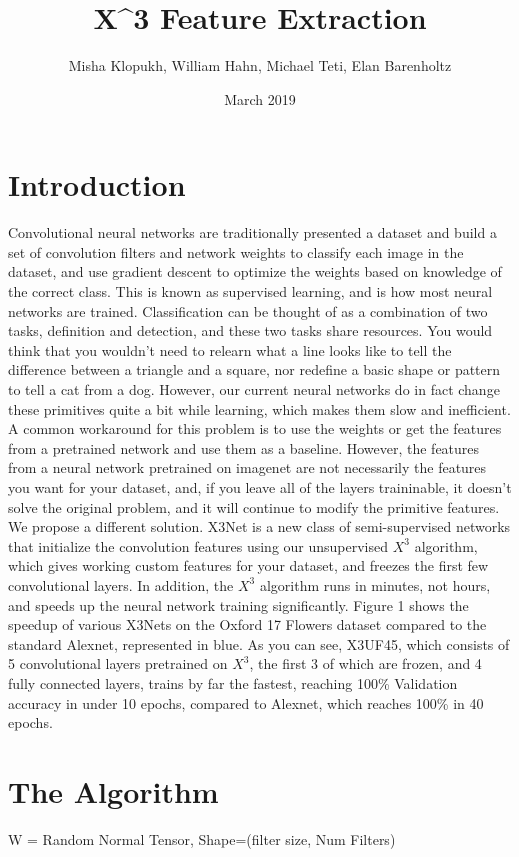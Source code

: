 \documentclass{article}
\title{X^3 Feature Extraction}
\author{Misha Klopukh, William Hahn, Michael Teti, Elan Barenholtz}
\date{March 2019}
\begin{document}
\maketitle

\section{Introduction}
Convolutional neural networks are traditionally presented a dataset and build a set of convolution filters and network weights to classify each image in the dataset, and use gradient descent to optimize the weights based on knowledge of the correct class. This is known as supervised learning, and is how most neural networks are trained. Classification can be thought of as a combination of two tasks, definition and detection, and these two tasks share resources. You would think that you wouldn't need to relearn what a line looks like to tell the difference between a triangle and a square, nor redefine a basic shape or pattern to tell a cat from a dog. However, our current neural networks do in fact change these primitives quite a bit while learning, which makes them slow and inefficient. A common workaround for this problem is to use the weights or get the features from a pretrained network and use them as a baseline. However, the features from a neural network pretrained on imagenet are not necessarily the features you want for your dataset, and, if you leave all of the layers traininable, it doesn't solve the original problem, and it will continue to modify the primitive features. We propose a different solution. X3Net is a new class of semi-supervised networks that initialize the convolution features using our unsupervised $X^3$ algorithm, which gives working custom features for your dataset, and freezes the first few convolutional layers. In addition, the $X^3$ algorithm runs in minutes, not hours, and speeds up the neural network training significantly. Figure 1 shows the speedup of various X3Nets on the Oxford 17 Flowers dataset compared to the standard Alexnet, represented in blue. As you can see, X3UF45, which consists of 5 convolutional layers pretrained on $X^3$, the first 3 of which are frozen, and 4 fully connected layers, trains by far the fastest, reaching 100\% Validation accuracy in under 10 epochs, compared to Alexnet, which reaches 100\% in 40 epochs.
\section{The Algorithm}
\begin{algorithm}[H]
\SetAlgoLined
{}
W = Random Normal Tensor, Shape=(filter size, Num Filters)\;
\caption{$X^3$}
\end{algorithm}
\end{document}
